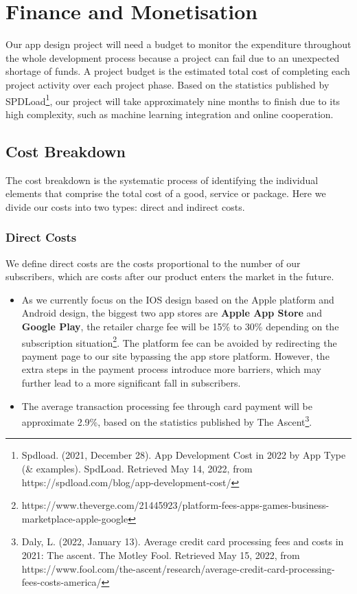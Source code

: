 \section{Finance and Monetisation}
\label{sec:Finance and Monetisation}
Our app design project will need a budget to monitor the expenditure throughout the whole development process because a project can fail due to an unexpected shortage of funds. 
A project budget is the estimated total cost of completing each project activity over each project phase. 
Based on the statistics published by SPDLoad\footnote{Spdload. (2021, December 28). App Development Cost in 2022 by App Type (\& examples). SpdLoad. Retrieved May 14, 2022, from https://spdload.com/blog/app-development-cost/}, our project will take approximately nine months to finish due to its high complexity, such as machine learning integration and online cooperation.
\subsection{Cost Breakdown}
The cost breakdown is the systematic process of identifying the individual elements that comprise the total cost of a good, service or package. Here we divide our costs into two types: direct and indirect costs.
\subsubsection{Direct Costs}
We define direct costs are the costs proportional to the number of our subscribers, which are costs after our product enters the market in the future.
\begin{itemize}
\item As we currently focus on the IOS design based on the Apple platform and Android design, the biggest two app stores are \textbf{Apple App Store} and \textbf{Google Play}, the retailer charge fee will be 15\% to 30\% depending on the subscription situation\footnote{https://www.theverge.com/21445923/platform-fees-apps-games-business-marketplace-apple-google}. The platform fee can be avoided by redirecting the payment page to our site bypassing the app store platform. However, the extra steps in the payment process introduce more barriers, which may further lead to a more significant fall in subscribers.
\item The average transaction processing fee through card payment will be approximate 2.9\%, based on the statistics published by The Ascent\footnote{Daly, L. (2022, January 13). Average credit card processing fees and costs in 2021: The ascent. The Motley Fool. Retrieved May 15, 2022, from https://www.fool.com/the-ascent/research/average-credit-card-processing-fees-costs-america/}.
\end{itemize}


